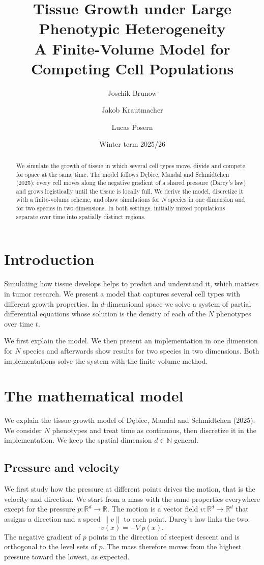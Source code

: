 \documentclass[11pt]{article}
\title{Tissue Growth under Large Phenotypic Heterogeneity\\
\large A Finite-Volume Model for Competing Cell Populations}
\author{Joschik Brunow \and Jakob Krautmacher \and Lucas Posern}
\date{Winter term 2025/26}
\begin{document}
\maketitle

\begin{abstract}
\noindent
We simulate the growth of tissue in which several cell types move, divide and
compete for space at the same time. The model follows Dębiec, Mandal and
Schmidtchen (2025): every cell moves along the negative gradient of a shared
pressure (Darcy's law) and grows logistically until the tissue is locally full.
We derive the model, discretize it with a finite-volume scheme, and show
simulations for $N$ species in one dimension and for two species in two
dimensions. In both settings, initially mixed populations separate over time into
spatially distinct regions.
\end{abstract}

\tableofcontents

\section{Introduction}
Simulating how tissue develops helps to predict and understand it, which matters
in tumor research. We present a model that captures several cell types with
different growth properties. In $d$-dimensional space we solve a system of partial
differential equations whose solution is the density of each of the $N$
phenotypes over time $t$.

We first explain the model. We then present an implementation in one dimension for
$N$ species and afterwards show results for two species in two dimensions. Both
implementations solve the system with the finite-volume method.

\section{The mathematical model}
\label{sec:model}
We explain the tissue-growth model of Dębiec, Mandal and Schmidtchen (2025). We
consider $N$ phenotypes and treat time as continuous, then discretize it in the
implementation. We keep the spatial dimension $d \in \mathbb{N}$ general.

\subsection{Pressure and velocity}
We first study how the pressure at different points drives the motion, that is the
velocity and direction. We start from a mass with the same properties everywhere
except for the pressure $p \colon \mathbb{R}^d \to \mathbb{R}$. The motion is a
vector field $v \colon \mathbb{R}^d \to \mathbb{R}^d$ that assigns a direction and
a speed $\lVert v \rVert$ to each point. Darcy's law links the two:
\begin{equation}
    v(x) = -\nabla p(x).
\end{equation}
The negative gradient of $p$ points in the direction of steepest descent and is
orthogonal to the level sets of $p$. The mass therefore moves from the highest
pressure toward the lowest, as expected.
\end{document}
